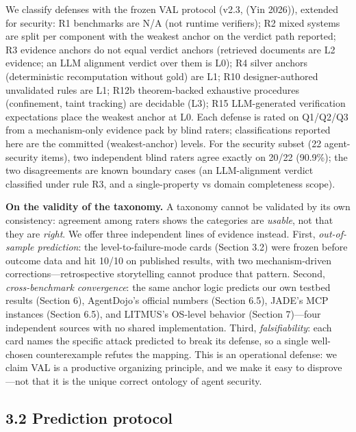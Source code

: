 \documentclass[11pt]{article}
\begin{document}
We classify defenses with the frozen VAL protocol (v2.3, (Yin 2026)), extended for security: R1 benchmarks are N/A (not runtime verifiers); R2 mixed systems are split per component with the weakest anchor on the verdict path reported; R3 evidence anchors do not equal verdict anchors (retrieved documents are L2 evidence; an LLM alignment verdict over them is L0); R4 silver anchors (deterministic recomputation without gold) are L1; R10 designer-authored unvalidated rules are L1; R12b theorem-backed exhaustive procedures (confinement, taint tracking) are decidable (L3); R15 LLM-generated verification expectations place the weakest anchor at L0. Each defense is rated on Q1/Q2/Q3 from a mechanism-only evidence pack by blind raters; classifications reported here are the committed (weakest-anchor) levels. For the security subset (22 agent-security items), two independent blind raters agree exactly on 20/22 (90.9\%); the two disagreements are known boundary cases (an LLM-alignment verdict classified under rule R3, and a single-property vs domain completeness scope).

\textbf{On the validity of the taxonomy.} A taxonomy cannot be validated by its own consistency: agreement among raters shows the categories are \emph{usable}, not that they are \emph{right}. We offer three independent lines of evidence instead. First, \emph{out-of-sample prediction}: the level-to-failure-mode cards (Section 3.2) were frozen before outcome data and hit 10/10 on published results, with two mechanism-driven corrections---retrospective storytelling cannot produce that pattern. Second, \emph{cross-benchmark convergence}: the same anchor logic predicts our own testbed results (Section 6), AgentDojo's official numbers (Section 6.5), JADE's MCP instances (Section 6.5), and LITMUS's OS-level behavior (Section 7)---four independent sources with no shared implementation. Third, \emph{falsifiability}: each card names the specific attack predicted to break its defense, so a single well-chosen counterexample refutes the mapping. This is an operational defense: we claim VAL is a productive organizing principle, and we make it easy to disprove---not that it is the unique correct ontology of agent security.

\subsection{3.2 Prediction protocol}\label{prediction-protocol}
\end{document}
